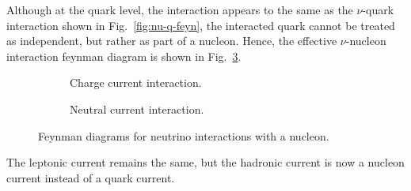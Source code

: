   Although at the quark level, the interaction appears to the same as the $\nu$-quark interaction shown in Fig.~\ref{fig:nu-q-feyn}, the interacted quark cannot be treated as independent, but rather as part of a nucleon.
  Hence, the effective $\nu$-nucleon interaction feynman diagram is shown in Fig.~\ref{fig:nu-n-feyn}.
  \begin{figure}[h]
    \centering
    \begin{subfigure}[b]{0.45\textwidth}
      \centering
      \caption{Charge current interaction.}
      \label{fig:cc-interaction-n}
    \end{subfigure}
    \hfill
    \begin{subfigure}[b]{0.45\textwidth}
      \centering
      \caption{Neutral current interaction.}
      \label{fig:nc-interaction-n}
    \end{subfigure}
    \caption{Feynman diagrams for neutrino interactions with a nucleon.}
    \label{fig:nu-n-feyn}
  \end{figure}
  The leptonic current remains the same, but the hadronic current is now a nucleon current instead of a quark current.

